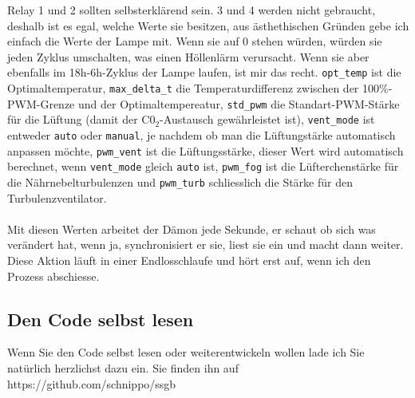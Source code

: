 \documentclass[12pt,titlepage,a4paper]{article}
\begin{document}
Relay 1 und 2 sollten selbsterklärend sein. 3 und 4 werden nicht gebraucht, deshalb ist es egal, welche Werte sie besitzen, aus ästhethischen Gründen gebe ich einfach die Werte der Lampe mit. Wenn sie auf 0 stehen würden, würden sie jeden Zyklus umschalten, was einen Höllenlärm verursacht. Wenn sie aber ebenfalls im 18h-6h-Zyklus der Lampe laufen, ist mir das recht. \verb^opt_temp^ ist die Optimaltemperatur, \verb^max_delta_t^ die Temperaturdifferenz zwischen der 100\%-PWM-Grenze und der Optimaltempereatur, \verb^std_pwm^ die Standart-PWM-Stärke für die Lüftung (damit der C0$ _{2} $-Austausch gewährleistet ist), \verb^vent_mode^ ist entweder \verb^auto^ oder \verb^manual^, je nachdem ob man die Lüftungstärke automatisch anpassen möchte, \verb^pwm_vent^ ist die Lüftungsstärke, dieser Wert wird automatisch berechnet, wenn \verb^vent_mode^ gleich \verb^auto^ ist, \verb^pwm_fog^ ist die Lüfterchenstärke für die Nährnebelturbulenzen und \verb^pwm_turb^ schliesslich die Stärke für den Turbulenzventilator.\\ \\Mit diesen Werten arbeitet der Dämon jede Sekunde, er schaut ob sich was verändert hat, wenn ja, synchronisiert er sie, liest sie ein und macht dann weiter. Diese Aktion läuft in einer Endlosschlaufe und hört erst auf, wenn ich den Prozess abschiesse.

\subsection{Den Code selbst lesen}
Wenn Sie den Code selbst lesen oder weiterentwickeln wollen lade ich Sie natürlich herzlichst dazu ein. Sie finden ihn auf https://github.com/schnippo/ssgb
\end{document}
